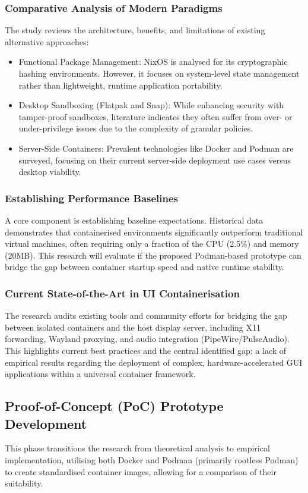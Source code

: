 \documentclass[journal,onecolumn]{IEEEtran}
\begin{document}
\subsubsection{Comparative Analysis of Modern Paradigms}
The study reviews the architecture, benefits, and limitations of existing alternative approaches:
\begin{itemize}
    \item Functional Package Management: NixOS is analysed for its cryptographic hashing environments. However, it focuses on system-level state management rather than lightweight, runtime application portability.
    \item Desktop Sandboxing (Flatpak and Snap): While enhancing security with tamper-proof sandboxes, literature indicates they often suffer from over- or under-privilege issues due to the complexity of granular policies.
    \item Server-Side Containers: Prevalent technologies like Docker and Podman are surveyed, focusing on their current server-side deployment use cases versus desktop viability.
\end{itemize}

\subsubsection{Establishing Performance Baselines}
A core component is establishing baseline expectations. Historical data demonstrates that containerised environments significantly outperform traditional virtual machines, often requiring only a fraction of the CPU (2.5\%) and memory (20MB). This research will evaluate if the proposed Podman-based prototype can bridge the gap between container startup speed and native runtime stability.

\subsubsection{Current State-of-the-Art in UI Containerisation}
The research audits existing tools and community efforts for bridging the gap between isolated containers and the host display server, including X11 forwarding, Wayland proxying, and audio integration (PipeWire/PulseAudio). This highlights current best practices and the central identified gap: a lack of empirical results regarding the deployment of complex, hardware-accelerated GUI applications within a universal container framework.

\subsection{Proof-of-Concept (PoC) Prototype Development}
This phase transitions the research from theoretical analysis to empirical implementation, utilising both Docker and Podman (primarily rootless Podman) to create standardised container images, allowing for a comparison of their suitability.
\end{document}
